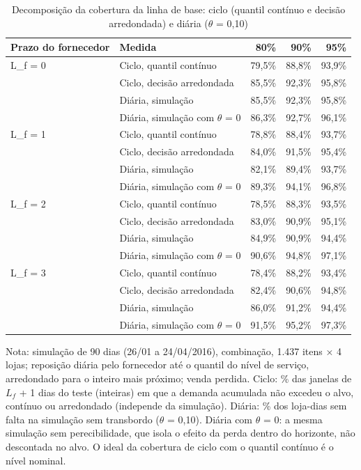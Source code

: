 \begin{table}[htbp]
\centering
\small
\caption{Decomposição da cobertura da linha de base: ciclo (quantil contínuo e decisão arredondada) e diária ($\theta$ = 0,10)}
\label{tab:tbr_cobertura_decomposicao}
\begin{tabular}{llrrr}
\toprule
Prazo do fornecedor & Medida & 80\% & 90\% & 95\% \\
\midrule
L\_f = 0 & Ciclo, quantil contínuo & 79,5\% & 88,8\% & 93,9\% \\
 & Ciclo, decisão arredondada & 85,5\% & 92,3\% & 95,8\% \\
 & Diária, simulação & 85,5\% & 92,3\% & 95,8\% \\
 & Diária, simulação com $\theta$ = 0 & 86,3\% & 92,7\% & 96,1\% \\
\addlinespace
L\_f = 1 & Ciclo, quantil contínuo & 78,8\% & 88,4\% & 93,7\% \\
 & Ciclo, decisão arredondada & 84,0\% & 91,5\% & 95,4\% \\
 & Diária, simulação & 82,1\% & 89,4\% & 93,7\% \\
 & Diária, simulação com $\theta$ = 0 & 89,3\% & 94,1\% & 96,8\% \\
\addlinespace
L\_f = 2 & Ciclo, quantil contínuo & 78,5\% & 88,3\% & 93,5\% \\
 & Ciclo, decisão arredondada & 83,0\% & 90,9\% & 95,1\% \\
 & Diária, simulação & 84,9\% & 90,9\% & 94,4\% \\
 & Diária, simulação com $\theta$ = 0 & 90,6\% & 94,8\% & 97,1\% \\
\addlinespace
L\_f = 3 & Ciclo, quantil contínuo & 78,4\% & 88,2\% & 93,4\% \\
 & Ciclo, decisão arredondada & 82,4\% & 90,6\% & 94,8\% \\
 & Diária, simulação & 86,0\% & 91,2\% & 94,4\% \\
 & Diária, simulação com $\theta$ = 0 & 91,5\% & 95,2\% & 97,3\% \\
\bottomrule
\end{tabular}
\par\smallskip
{\footnotesize Nota: simulação de 90 dias (26/01 a 24/04/2016), combinação, 1.437 itens × 4 lojas; reposição diária pelo fornecedor até o quantil do nível de serviço, arredondado para o inteiro mais próximo; venda perdida. Ciclo: \% das janelas de $L_f$ + 1 dias do teste (inteiras) em que a demanda acumulada não excedeu o alvo, contínuo ou arredondado (independe da simulação). Diária: \% dos loja-dias sem falta na simulação sem transbordo ($\theta$ = 0,10). Diária com $\theta$ = 0: a mesma simulação sem perecibilidade, que isola o efeito da perda dentro do horizonte, não descontada no alvo. O ideal da cobertura de ciclo com o quantil contínuo é o nível nominal.}
\end{table}
